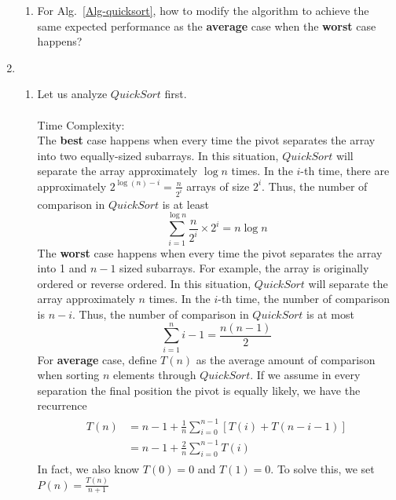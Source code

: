 \documentclass[12pt,a4paper]{article}
\makeatletter
\newtheorem*{solution}{Solution}
\theoremstyle{definition}
\renewenvironment{solution}[1][Solution] {\par\pushQED{\qed}\normalfont\topsep6\p@\@plus6\p@\relax\trivlist\item[\hskip\labelsep\bfseries#1\@addpunct{.}]\ignorespaces}{\popQED\endtrivlist\@endpefalse} \makeatother
\makeatother
\begin{document}
\begin{enumerate}
\begin{enumerate}
\item For Alg.~\ref{Alg-quicksort}, how to modify the algorithm to achieve the same expected performance as the \textbf{average} case when the \textbf{worst} case happens?
\end{enumerate} 
    \begin{solution}
    ~
    \begin{enumerate}
    \item 
      Let us analyze $QuickSort$ first.\\
      ~\\
      Time Complexity:\\
      The \textbf{best} case happens when every time the pivot separates the array into two equally-sized subarrays.  In this situation, $QuickSort$ will separate the array approximately $\log n$ times. In the $i$-th time, there are approximately $2^{\log(n)-i} = \frac{n}{2^{i}}$  arrays of size $2^{i}$. Thus, the number of comparison in $QuickSort$ is at least  \begin{equation}
          \sum_{i = 1}^{\log n} \frac{n}{2^i}\times 2^i = n\log n
      \end{equation}
      The \textbf{worst} case happens when every time the pivot separates the array into 1 and $n-1$ sized subarrays. For example, the array is originally ordered or reverse ordered. In this situation, $QuickSort$ will separate the array approximately $n$ times. In the $i$-th time, the number of comparison is $n-i$. Thus, the number of comparison in $QuickSort$ is at most
      \begin{equation}
          \sum_{i = 1}^{n}i-1 = \frac{n(n-1)}{2}
      \end{equation}
      For \textbf{average} case, define $T(n)$ as the average amount of comparison when sorting $n$ elements through $QuickSort$. If we assume in every separation the final position the pivot is equally likely, we have the recurrence
      \begin{align}
        \begin{split}
          T(n) &= n-1 + \frac{1}{n}\sum_{i = 0}^{n-1}[T(i)+T(n-i-1)]\\ 
          &= n-1 + \frac{2}{n}\sum_{i = 0}^{n-1}T(i)
        \end{split}
      \end{align}
       In fact, we also know $T(0) = 0$ and $T(1) = 0$. To solve this, we set $P(n) = \frac{T(n)}{n+1}$
       \begin{align}
        \begin{split}

\end{split}
\end{align}
\end{enumerate}
\end{solution}
\end{enumerate}
\end{document}
